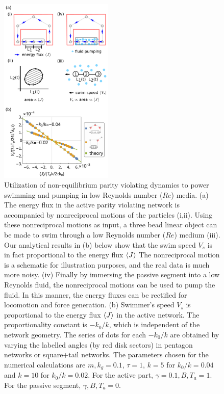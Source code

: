 \documentclass[
 preprint,
 preprintnumbers,
 amsmath,amssymb,
 aps,
 pre,
 longbibliography,
 superscriptaddress,
 10pt, twocolumn
]{revtex4-1}
\begin{document}
\begin{figure}[h!]
	\centering
	\includegraphics[width=0.48\textwidth]{swimmer.pdf}
    \caption{Utilization of non-equilibrium parity violating dynamics to power swimming and pumping in low Reynolds number ($Re$) media.
    (a) The energy flux in the active parity violating network is accompanied by nonreciprocal motions of the particles (i,ii). Using these nonreciprocal motions as input, a three bead linear object can be made to swim through a low Reynolds number ($Re$) medium (iii). Our analytical results in (b) below show that the swim speed $V_s$ is in fact proportional to the energy flux $\expval{J}$ The nonreciprocal motion is a schematic for illustration purposes, and the real data is much more noisy. (iv) Finally by immersing the passive segment into a low Reynolds fluid, the nonreciprocal motions can be used to pump the fluid. In this manner, the energy fluxes can be rectified for locomotion and force generation. 
    (b) Swimmer's speed $V_s$ is proportional to the energy flux $\expval{J}$ in the active network. The proportionality constant is $-k_0/k$, which is independent of the network geometry. The series of dots for each $-k_0/k$ are obtained by varying the labelled angles (by red disk sectors) in pentagon networks or square+tail networks. The parameters chosen for the numerical calculations are $m,k_g=0.1$, $\tau=1$, $k=5$ for $k_0/k=0.04$ and $k=10$ for $k_0/k=0.02$. For the active part, $\gamma=0.1, B,T_a=1$. For the passive segment, $\gamma,B,T_a=0$.
    }
    \label{fig:swimmer}
\end{figure}
\end{document}
